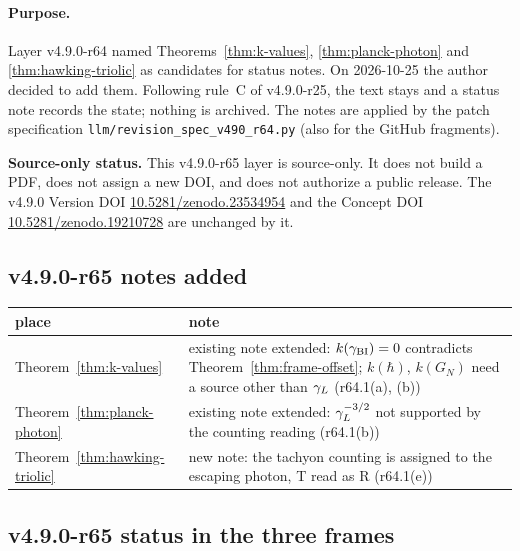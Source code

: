 \paragraph{Purpose.}
Layer v4.9.0-r64 named Theorems~\ref{thm:k-values}, \ref{thm:planck-photon} and \ref{thm:hawking-triolic} as candidates for status notes.  On 2026-10-25 the author
decided to add them.  Following rule~C of v4.9.0-r25, the text stays and a status note records the state; nothing is archived.  The notes are applied by the patch
specification \texttt{llm/revision\_spec\_v490\_r64.py} (also for the GitHub fragments).

\noindent\textbf{Source-only status.}
This v4.9.0-r65 layer is source-only.  It does not build a PDF, does not assign a new DOI,
and does not authorize a public release.  The v4.9.0 Version DOI
\href{https://doi.org/10.5281/zenodo.23534954}{10.5281/zenodo.23534954} and the Concept DOI
\href{https://doi.org/10.5281/zenodo.19210728}{10.5281/zenodo.19210728} are unchanged by it.

\subsection*{v4.9.0-r65 notes added}
\label{subsec:v490-r65-notes}

\begin{center}
\small
\begin{tabular}{@{}>{\raggedright\arraybackslash}p{}>{\raggedright\arraybackslash}p{}@{}}
\toprule
place & note\\
\midrule
Theorem~\ref{thm:k-values} & existing note extended: \(k(\gamma_{\mathrm{BI}})=0\) contradicts Theorem~\ref{thm:frame-offset}; \(k(\hbar)\), \(k(G_N)\) need a source other than \(\gamma_L\) (r64.1(a), (b))\\
Theorem~\ref{thm:planck-photon} & existing note extended: \(\gamma_L^{-3/2}\) not supported by the counting reading (r64.1(b))\\
Theorem~\ref{thm:hawking-triolic} & new note: the tachyon counting is assigned to the escaping photon, T read as R (r64.1(e))\\
\bottomrule
\end{tabular}
\end{center}

\subsection*{v4.9.0-r65 status in the three frames}
\label{subsec:v490-r65-frames}


